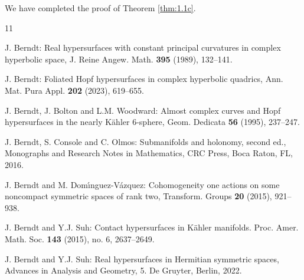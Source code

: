 \documentclass[reqno]{amsart}%
\theoremstyle{definition}
\numberwithin{equation}{section}
\begin{document}
We have completed the proof of Theorem \ref{thm:1.1c}.







\normalsize\noindent
\begin{thebibliography}{11}



J. Berndt:
Real hypersurfaces with constant principal curvatures in complex
hyperbolic space, J. Reine Angew. Math. {\bf395} (1989), 132--141.

J. Berndt:
Foliated Hopf hypersurfaces in complex hyperbolic quadrics,
Ann. Mat. Pura Appl. {\bf 202} (2023), 619--655.

J. Berndt, J. Bolton and L.M. Woodward:
Almost complex curves and Hopf hypersurfaces in the nearly K\"ahler
$6$-sphere, Geom. Dedicata {\bf56} (1995), 237--247.

J. Berndt, S. Console and C. Olmos:
Submanifolds and holonomy, second ed., Monographs and Research Notes in Mathematics, CRC
Press, Boca Raton, FL, 2016.



J. Berndt and M. Dom\'{\i}nguez-V\'{a}zquez: Cohomogeneity one actions on some noncompact
symmetric spaces of rank two, Transform. Groups {\bf 20} (2015), 921--938.

J. Berndt and Y.J. Suh:
Contact hypersurfaces in K\"{a}hler manifolds.
Proc. Amer. Math. Soc. {\bf143} (2015), no. 6, 2637--2649.

J. Berndt and Y.J. Suh:
Real hypersurfaces in Hermitian symmetric spaces, Advances in Analysis and Geometry, 5. De Gruyter, Berlin, 2022.



\end{thebibliography}
\end{document}
